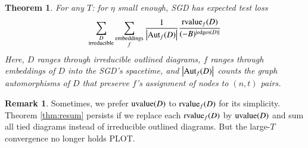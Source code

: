 \documentclass{article}
\theoremstyle{plain}
\newtheorem{thm}{Theorem}
\theoremstyle{definition}
\newtheorem{rmk}{Remark}
\newcommand{\wabs}[1]{\left|#1\right|}
\newcommand{\Aut}{\text{\textnormal{Aut}}}
\newcommand{\uvalue}{\text{\textnormal{uvalue}}}
\newcommand{\rvalue}{\text{\textnormal{rvalue}}}
\newcommand{\edges}{\text{\textnormal{edges}}}
\begin{document}
        \begin{thm}
            For any $T$: for $\eta$ small enough, SGD has expected test loss
            \begin{equation*} \label{eq:resum}
                \sum_{\substack{D \\ \text{irreducible}}}
                \sum_{\substack{\text{embeddings} \\ f}}
                \frac{1}{\wabs{\Aut_f(D)}}
                \frac{{\rvalue_f}(D)}{(-B)^{|\edges(D)|}}
            \end{equation*}
            Here, $D$ ranges through irreducible outlined diagrams, $f$ ranges
            through embeddings of $D$ into the SGD's spacetime, and
            $\wabs{\Aut_f(D)}$ counts the graph automorphisms of $D$ that
            preserve $f$'s assignment of nodes to $(n,t)$ pairs.
        \end{thm}

        \begin{rmk}
            Sometimes, we prefer $\uvalue(D)$ to $\rvalue_f(D)$ for its
            simplicity.  Theorem \ref{thm:resum} persists if we replace each
            $\rvalue_f(D)$ by $\uvalue(D)$ and sum all tied diagrams instead
            of irreducible outlined diagrams.  But the large-$T$ convergence
            no longer holds {\color{red} PLOT}.
        \end{rmk}
\end{document}

